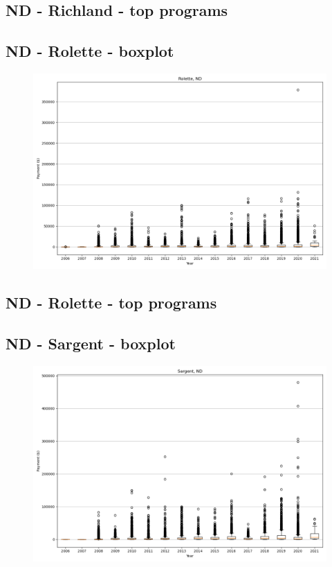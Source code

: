 \subsection*{ND - Richland - top programs}

\newpage
\subsection*{ND - Rolette - boxplot}
\begin{figure}[h]
\centering
\includegraphics[width=7in]{../output/boxplots/counties/Rolette-ND_boxplot.png}
\end{figure}


\subsection*{ND - Rolette - top programs}

\newpage
\subsection*{ND - Sargent - boxplot}
\begin{figure}[h]
\centering
\includegraphics[width=7in]{../output/boxplots/counties/Sargent-ND_boxplot.png}
\end{figure}


